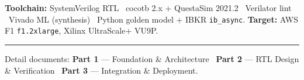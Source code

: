 \documentclass[10pt,a4paper]{article}
\newcommand{\hruleline}{\textcolor{rulegray}{\rule{\linewidth}{1pt}}}
\begin{document}
\vspace{2pt}
\textbf{Toolchain:} SystemVerilog RTL \textbullet\ cocotb 2.x + QuestaSim 2021.2 \textbullet\
Verilator lint \textbullet\ Vivado ML (synthesis) \textbullet\ Python golden model + IBKR
\texttt{ib\_async}. \quad \textbf{Target:} AWS F1 \texttt{f1.2xlarge}, Xilinx UltraScale+ VU9P.

\vfill
\hruleline
{\footnotesize\color{rulegray}
Detail documents: \textbf{Part 1} --- Foundation \& Architecture \textbullet\
\textbf{Part 2} --- RTL Design \& Verification \textbullet\
\textbf{Part 3} --- Integration \& Deployment.}
\end{document}
